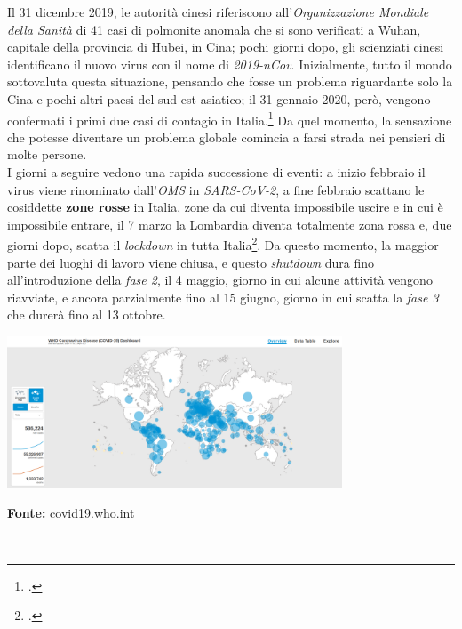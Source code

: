 Il 31 dicembre 2019, le autorità cinesi riferiscono all'\textit{Organizzazione Mondiale della Sanità} di 41 casi di polmonite anomala che si sono verificati a Wuhan, capitale della provincia di Hubei, in Cina; pochi giorni dopo, gli scienziati cinesi identificano il nuovo virus con il nome di \textit{2019-nCov}. Inizialmente, tutto il mondo sottovaluta questa situazione, pensando che fosse un problema riguardante solo la Cina e pochi altri paesi del sud-est asiatico; il 31 gennaio 2020, però, vengono confermati i primi due casi di contagio in Italia.\footcite{sole24ore:cronistoria-covid} Da quel momento, la sensazione che potesse diventare un problema globale comincia a farsi strada nei pensieri di molte persone. \\
I giorni a seguire vedono una rapida successione di eventi: a inizio febbraio il virus viene rinominato dall'\textit{OMS} in \textit{SARS-CoV-2}, a fine febbraio scattano le cosiddette \textbf{zone rosse} in Italia, zone da cui diventa impossibile uscire e in cui è impossibile entrare, il 7 marzo la Lombardia diventa totalmente zona rossa e, due giorni dopo, scatta il \textit{lockdown} in tutta Italia\footcite{sole24ore:cronistoria-covid}. Da questo momento, la maggior parte dei luoghi di lavoro viene chiusa, e questo \textit{shutdown} dura fino all'introduzione della \textit{fase 2}, il 4 maggio, giorno in cui alcune attività vengono riavviate, e ancora parzialmente fino al 15 giugno, giorno in cui scatta la \textit{fase 3} che durerà fino al 13 ottobre. \\

\begin{minipage}{\linewidth}
  \centering
    \includegraphics[height=4.5cm]{immagini/covid}
  \caption*{\textbf{Fonte:} covid19.who.int}
\end{minipage} \\

